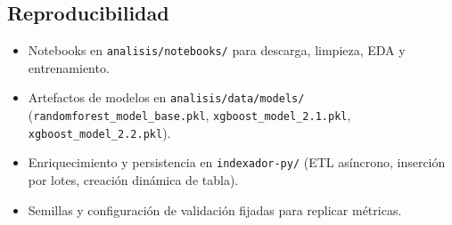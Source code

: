 \subsection{Reproducibilidad}
\begin{itemize}
    \item Notebooks en \texttt{analisis/notebooks/} para descarga, limpieza, EDA y entrenamiento.
    \item Artefactos de modelos en \texttt{analisis/data/models/} (\texttt{randomforest\_model\_base.pkl}, \texttt{xgboost\_model\_2.1.pkl}, \texttt{xgboost\_model\_2.2.pkl}).
    \item Enriquecimiento y persistencia en \texttt{indexador-py/} (ETL asíncrono, inserción por lotes, creación dinámica de tabla).
    \item Semillas y configuración de validación fijadas para replicar métricas.
\end{itemize}

